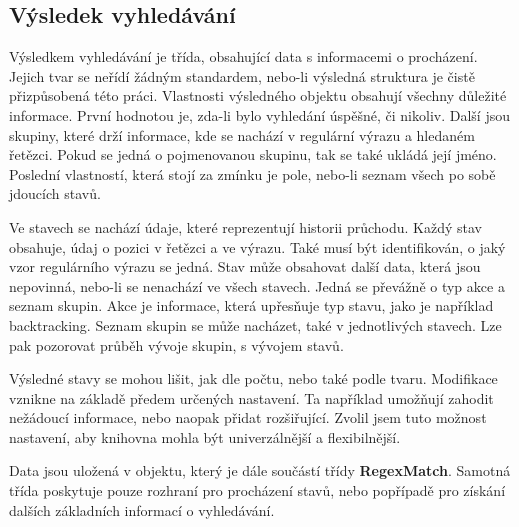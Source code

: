 \subsection*{Výsledek vyhledávání}

Výsledkem vyhledávání je třída, obsahující data s informacemi o procházení.
Jejich tvar se neřídí žádným standardem, nebo-li výsledná struktura je čistě přizpůsobená této práci.
Vlastnosti výsledného objektu obsahují všechny důležité informace.
První hodnotou je, zda-li bylo vyhledání úspěšné, či nikoliv. 
Další jsou skupiny, které drží informace, kde se nachází v regulární výrazu a hledaném řetězci. 
Pokud se jedná o pojmenovanou skupinu, tak se také ukládá její jméno. 
Poslední vlastností, která stojí za zmínku je pole, nebo-li seznam všech po sobě jdoucích stavů.

Ve stavech se nachází údaje, které reprezentují historii průchodu.
Každý stav obsahuje, údaj o pozici v řetězci a ve výrazu. 
Také musí být identifikován, o jaký vzor regulárního výrazu se jedná.
Stav může obsahovat další data, která jsou nepovinná, nebo-li se nenachází ve všech stavech.
Jedná se převážně o typ akce a seznam skupin.
Akce je informace, která upřesňuje typ stavu, jako je například backtracking.
Seznam skupin se může nacházet, také v jednotlivých stavech.
Lze pak pozorovat průběh vývoje skupin, s vývojem stavů.

Výsledné stavy se mohou lišit, jak dle počtu, nebo také podle tvaru. 
Modifikace vznikne na základě předem určených nastavení.
Ta například umožňují zahodit nežádoucí informace, nebo naopak přidat rozšiřující.
Zvolil jsem tuto možnost nastavení, aby knihovna mohla být univerzálnější a flexibilnější.

Data jsou uložená v objektu, který je dále součástí třídy \textbf{RegexMatch}.
Samotná třída poskytuje pouze rozhraní pro procházení stavů, nebo popřípadě pro získání dalších základních informací o vyhledávání.

\endinput
